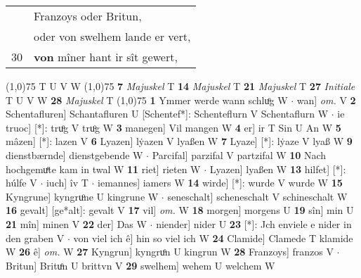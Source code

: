 \documentclass[8pt,a4paper,notitlepage]{article}
\begin{document}
\begin{table}[ht]
\begin{minipage}[t]{0.5\linewidth}
\begin{tabular}{rl}
 & Franzoys oder Britun,\\ 
 & oder von swelhem lande er vert,\\ 
30 & \textbf{von} mîner hant ir sît gewert,\\ 
\end{tabular}
\scriptsize
\line(1,0){75} \newline
T U V W \newline
\line(1,0){75} \newline
\textbf{7} \textit{Majuskel} T  \textbf{14} \textit{Majuskel} T  \textbf{21} \textit{Majuskel} T  \textbf{27} \textit{Initiale} T U V W  \textbf{28} \textit{Majuskel} T  \newline
\line(1,0){75} \newline
\textbf{1} Ymmer werde wann schluͦg W  $\cdot$ wan] \textit{om.} V \textbf{2} Schentafluren] Schantafluren U [Schentef*]: Schenteflurn V Schentaflurn W  $\cdot$ ie truoc] [*]: truͦg V truͦg W \textbf{3} manegen] Vil mangen W \textbf{4} er] ir T Sin U An W \textbf{5} mâzen] [*]: lazen V \textbf{6} Lyazen] lẏazen V lyaßen W \textbf{7} Lyaze] [*]: lẏaze V lyaß W \textbf{9} dienstbærnde] dienstgebende W  $\cdot$ Parcifal] parzifal V partzifal W \textbf{10} Nach hochgemuͤte kam in twal W \textbf{11} riet] rieten W  $\cdot$ Lyazen] lyaßen W \textbf{13} hilfet] [*]: húlfe V  $\cdot$ iuch] îv T  $\cdot$ iemannes] iamers W \textbf{14} wirde] [*]: wurde V wurde W \textbf{15} Kyngrune] kyngruͦne U kingrune W  $\cdot$ seneschalt] scheneschalt V schineschalt W \textbf{16} gevalt] [ge*alt]: gevalt V \textbf{17} vil] \textit{om.} W \textbf{18} morgen] morgens U \textbf{19} sîn] min U \textbf{21} mîn] minen V \textbf{22} der] Das W  $\cdot$ niender] nider U \textbf{23} [*]: Jch enviele e nider in den graben V  $\cdot$ von viel ich ê] hin so viel ich W \textbf{24} Clamide] Clamede T klamide W \textbf{26} ê] \textit{om.} W \textbf{27} Kyngrun] kyngruͦn U kingrun W \textbf{28} Franzoys] franzos V  $\cdot$ Britun] Brituͦn U brittvn V \textbf{29} swelhem] wehem U welchem W \newline
\end{minipage}
\end{table}
\end{document}
